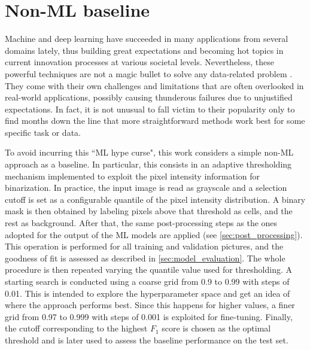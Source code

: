 \section{Non-ML baseline}
\label{baseline}

Machine and deep learning have succeeded in many applications from several domains lately, thus building great expectations and becoming hot topics in current innovation processes at various societal levels.
Nevertheless, these powerful techniques are not a magic bullet to solve any data-related problem \cite{wolpert1997nofreelunch}. They come with their own challenges and limitations that are often overlooked in real-world applications, possibly causing thunderous failures due to unjustified expectations.
In fact, it is not unusual to fall victim to their popularity only to find months down the line that more straightforward methods work best for some specific task or data.

To avoid incurring this ``ML hype curse", this work considers a simple \mbox{non-ML} approach as a baseline. 
In particular, this consists in an adaptive thresholding mechanism implemented to exploit the pixel intensity information for binarization.
In practice, the input image is read as grayscale and a selection cutoff is set as a configurable quantile of the pixel intensity distribution.
A binary mask is then obtained by labeling pixels above that threshold as cells, and the rest as background.
After that, the same post-processing steps as the ones adopted for the output of the ML models are applied (see \cref{sec:post_processing}).
This operation is performed for all training and validation pictures, and the goodness of fit is assessed as described in \cref{sec:model_evaluation}.
The whole procedure is then repeated varying the quantile value used for thresholding. A starting search is conducted using a coarse grid from 0.9 to 0.99 with steps of 0.01. This is intended to explore the hyperparameter space and get an idea of where the approach performs best. 
Since this happens for higher values, a finer grid from 0.97 to 0.999 with steps of 0.001 is exploited for fine-tuning.
Finally, the cutoff corresponding to the highest $F_1$ score is chosen as the optimal threshold and is later used to assess the baseline performance on the test set.